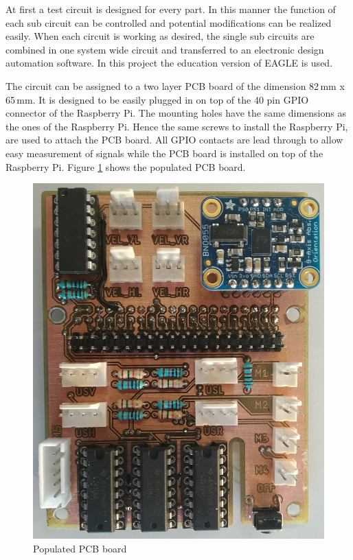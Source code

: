 At first a test circuit is designed for every part. In this manner the function of each sub circuit can be controlled and potential modifications can be realized easily. When each circuit is working as desired, the single sub circuits are combined in one system wide circuit and transferred to an electronic design automation software. In this project the education version of EAGLE \cite{eagle} is used.

The circuit can be assigned to a two layer PCB board of the dimension 82\,mm x 65\,mm. It is designed to be easily plugged in on top of the 40 pin GPIO connector of the Raspberry Pi. The mounting holes have the same dimensions as the ones of the Raspberry Pi. Hence the same screws to install the Raspberry Pi, are used to attach the PCB board. All GPIO contacts are lead through to allow easy measurement of signals while the PCB board is installed on top of the Raspberry Pi. Figure \ref{fig:pcb} shows the populated PCB board.

\begin{figure}[H]
\centering
\includegraphics[scale=0.15]{sources/pcb.jpg}
\caption[Populated PCB board]{Populated PCB board}
\label{fig:pcb}
\end{figure}
